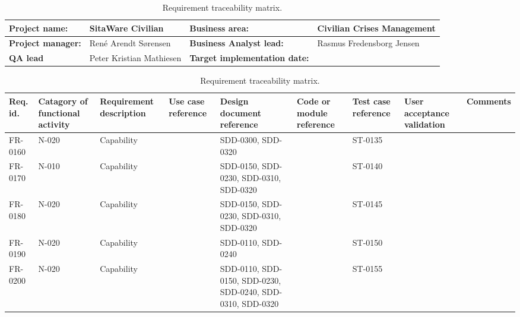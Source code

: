 \begin{sidewaystable}
\begin{table}[H]
\begin{tabular}{|l|l|l|l|}
\hline
 \textbf{Project name:} & SitaWare Civilian & \textbf{Business area:}  & Civilian Crises Management\\ \hline
 \textbf{Project manager:} & René Arendt Sørensen & \textbf{Business Analyst lead:} & Rasmus Fredensborg  Jensen\\ \hline
 \textbf{QA lead} & Peter Kristian Mathiesen & \textbf{Target implementation date:}  & \\ \hline
\end{tabular}	
\begin{tabular}{|p{2cm}|p{2cm}|p{3cm}|p{2cm}|p{2cm}|p{2cm}|p{2cm}|p{2cm}|p{2cm}|}
\hline
 Req. id. & Catagory of functional activity & Requirement description  & Use case reference & Design document reference & Code or module reference & Test case reference & User acceptance validation & Comments\\ \hline
  FR-0160 & N-020 & Capability & &SDD-0300, SDD-0320 & & ST-0135& &\\ \hline
 FR-0170 & N-010 & Capability & &SDD-0150, SDD-0230, SDD-0310, SDD-0320 & & ST-0140& &\\ \hline 
 FR-0180 & N-020 & Capability & &SDD-0150, SDD-0230, SDD-0310, SDD-0320  & & ST-0145& &\\ \hline
 FR-0190 & N-020 & Capability & &SDD-0110, SDD-0240 & & ST-0150& &\\ \hline
 FR-0200 & N-020 & Capability & &SDD-0110,  SDD-0150, SDD-0230, SDD-0240, SDD-0310, SDD-0320& & ST-0155& &\\ \hline 
\end{tabular}	
\caption{Requirement traceability matrix.}
\end{table}

\end{sidewaystable}



